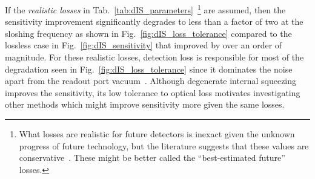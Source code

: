 If the \emph{realistic losses} in Tab.~\ref{tab:dIS_parameters}~\footnote{What losses are realistic for future detectors is inexact given the unknown progress of future technology, but the literature suggests that these values are conservative~\cite{zhangBroadbandSignalRecycling2021,}. These might be better called the ``best-estimated future'' losses.} are assumed, then the sensitivity improvement significantly degrades to less than a factor of two at the sloshing frequency as shown in Fig.~\ref{fig:dIS_loss_tolerance} compared to the lossless case in Fig.~\ref{fig:dIS_sensitivity} that improved by over an order of magnitude. For these realistic losses, detection loss is responsible for most of the degradation seen in Fig.~\ref{fig:dIS_loss_tolerance} since it dominates the noise apart from the readout port vacuum~\cite{}. %
Although degenerate internal squeezing improves the sensitivity, its low tolerance to optical loss motivates investigating other methods which might improve sensitivity more given the same losses. 





